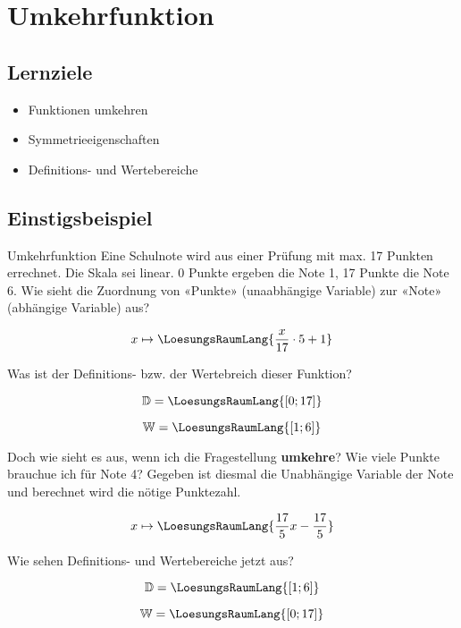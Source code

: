 \section{Umkehrfunktion}

\subsection{Lernziele}

\begin{itemize}
\item Funktionen umkehren
\item Symmetrieeigenschaften
\item Definitions- und Wertebereiche
\end{itemize} 
\newpage

\subsection{Einstigsbeispiel}
\begin{beispiel}{Umkehrfunktion}{}
  Eine Schulnote wird aus einer Prüfung mit max. 17 Punkten errechnet.
  Die Skala sei linear. 0 Punkte ergeben die Note 1, 17 Punkte die
  Note 6. Wie sieht die Zuordnung von «Punkte» (unaabhängige Variable)
  zur «Note» (abhängige Variable) aus?

  \leserluft
  
  $$x \mapsto  \LoesungsRaumLang{\frac{x}{17}\cdot{} 5 + 1}$$

  Was ist der Definitions- bzw. der Wertebreich dieser Funktion?

  \leserluft
  
  $$\mathbb{D} = \LoesungsRaumLang{[0; 17]}$$

  \leserluft
  
  $$\mathbb{W} = \LoesungsRaumLang{[1; 6]}$$

  Doch wie sieht es aus, wenn ich die Fragestellung \textbf{umkehre}?
  Wie viele Punkte brauchue ich für Note 4? Gegeben ist diesmal die
  Unabhängige Variable der Note und berechnet wird die nötige
  Punktezahl.

  \leserluft{}
  
  $$x \mapsto \LoesungsRaumLang{\frac{17}5 x - \frac{17}5}$$

    Wie sehen Definitions- und Wertebereiche jetzt aus?

    $$\mathbb{D} = \LoesungsRaumLang{ [1; 6] }$$


    $$\mathbb{W} = \LoesungsRaumLang{ [0;17] }$$
  
\end{beispiel}
\newpage

